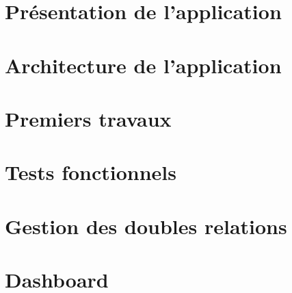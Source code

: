 
\section{Présentation de l'application}
\label{prezAppNeuflize}
	
	
\section{Architecture de l'application}
	
	
\section{Premiers travaux}
	
	
\section{Tests fonctionnels}
	
	
\section{Gestion des doubles relations}
	
	
\section{Dashboard}
	